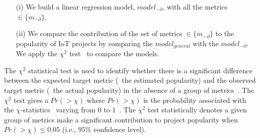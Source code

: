 \begin{enumerate}
	\item[(i)] We build a linear regression model, $model_{-\partial}$, with all the metrics $\in  \{m_{-\partial}\}$.
	\item[(ii)] We compare the contribution of the set of metrics $\in
	\{m_{-\partial}\}$ to the popularity of IoT projects by comparing the
	$model_{general}$ with the $model_{-\partial}$. We apply the $\chi^2$
	test~\cite{satorra2001scaled,pearson1893contributions} to compare the
	models.
\end{enumerate}

The $\chi^2$ statistical test is used to identify whether there is a significant difference between the expected target metric (\eg~the estimated popularity) and the observed target metric (\eg~the actual popularity) in the absence of a group of metrics~\cite{satorra2001scaled,pearson1893contributions}.
The $\chi^2$ test gives a $Pr(>\chi)$ where $Pr(>\chi)$ is the probability associated with the $\chi$-statistics~\cite{rice1989analyzing} varying from $0$ to $1$~\cite{rice1989analyzing}.
The $\chi^2$ test statistically denotes a given group of metrics make a significant contribution to project popularity when $Pr(>\chi)\le 0.05$ (i.e., $95\%$ confidence level).
